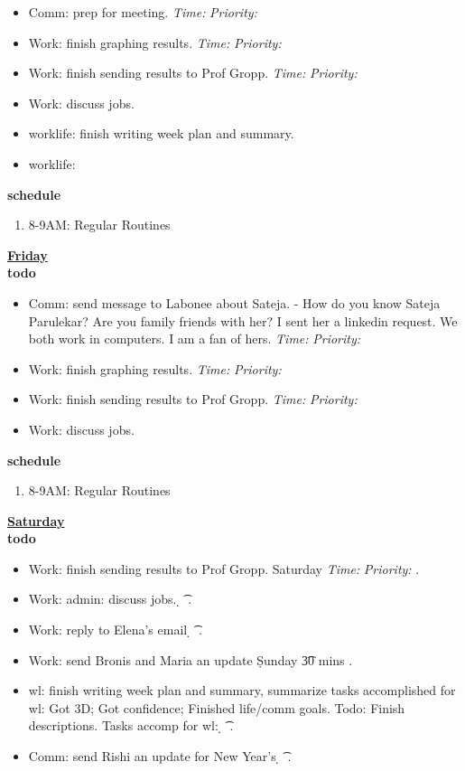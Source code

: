 \documentclass[11pt]{article}
\newcommand{\timeEst}[1]{\textit{Time:} \textit{#1}}
\newcommand{\priority}[1]{\textit{Priority:} \textit{#1}}
\newcommand{\deadline}[1]{#1}
\begin{document}
{\begin{itemize}
    \tiny \item \tiny Comm: prep for meeting. \deadline{} \timeEst{} \priority{}  
  \item \tiny Work: finish graphing results.  \deadline{ }   \timeEst{}  \priority{}
  \item \tiny Work: finish sending results to Prof Gropp.  \deadline{ }   \timeEst{}  \priority{}  
  \item \tiny Work: discuss jobs.  
  \item \tiny worklife: finish writing week plan and summary. 
  \item \tiny worklife: 
  \end{itemize}
  \textbf{\small schedule} \\
  \begin{enumerate}
    \tiny \item \tiny 8-9AM: Regular Routines 
  \end{enumerate}  

  \textbf{\small \underline{Friday}} \\
  \textbf{\small todo} \\
  \begin{itemize}
    \tiny \item \tiny Comm: send message to Labonee about Sateja. - How do you know Sateja Parulekar? Are you family friends with her? I sent her a linkedin request. We both work in computers. I am a fan of hers. 
    \deadline{} \timeEst{} \priority{} 
  \item \tiny Work: finish graphing results.  \deadline{}  \timeEst{}  \priority{}
  \item \tiny Work: finish sending results to Prof Gropp.  \deadline{}   \timeEst{}  \priority{}  
  \item \tiny Work: discuss jobs.  
  \end{itemize} 
\textbf{\small schedule} \\
  \begin{enumerate}
    \tiny \item \tiny 8-9AM: Regular Routines 
  \end{enumerate} 

  \textbf{\small \underline{Saturday}} \\
  \textbf{\small todo} \\
  \begin{itemize} 
  \item \tiny Work: finish sending results to Prof Gropp. \deadline{Saturday}  \timeEst{}  \priority{}. 
  \item \tiny Work: admin: discuss jobs. \d{}  \t{} \p{}. 
  \item \tiny Work: reply to Elena's email \d{} \t{} \p{}. 
  \item \tiny Work: send Bronis and Maria an update \d{Sunday} \t{30 mins} . 
  \item \tiny wl: finish writing week plan and summary, summarize tasks accomplished for wl: Got 3D; Got confidence; Finished life/comm goals. 
    Todo: Finish descriptions. Tasks accomp for wl: \d{}  \t{}  \p{}. 
  \item \tiny Comm: send Rishi an update for New Year's \d{} \t{} \p{}.
  \end{itemize}
  
}
\end{document}
